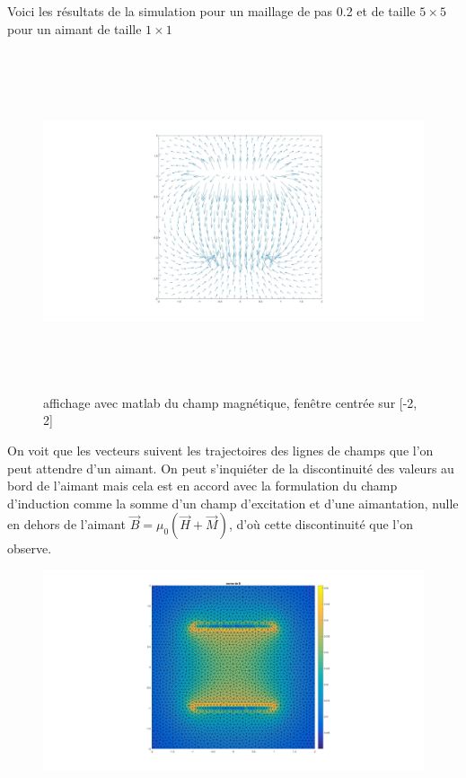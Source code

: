 \documentclass[a4paper,12pt,titlepage]{report}
\begin{document}
\begin{onehalfspace}
Voici les résultats de la simulation pour un maillage de pas 0.2 et de taille $5 \times 5$ pour un aimant de taille $1 \times 1$
\begin{figure}[!h]
\begin{center}
\includegraphics[height = 10cm, keepaspectratio]{graphes/resultat_champ.jpg}
\caption{affichage avec matlab du champ magnétique, fenêtre centrée sur [-2, 2]}
\label{figure 1}
\end{center}
\end{figure}
On voit que les vecteurs suivent les trajectoires des lignes de champs que l'on peut attendre d'un aimant.
On peut s'inquiéter de la discontinuité des valeurs au bord de l'aimant mais cela est en accord avec la formulation du champ d'induction comme la somme d'un champ d'excitation et d'une aimantation, nulle en dehors de l'aimant $\vec{B}=\mu _{0}(\vec{H}+\vec{M})$, d'où cette discontinuité que l'on observe.
\begin{figure}[!h]
\begin{center}
\includegraphics[height = 8 cm, keepaspectratio]{graphes/norme_du_champ.jpg}

\end{center}
\end{figure}
\end{onehalfspace}
\end{document}
